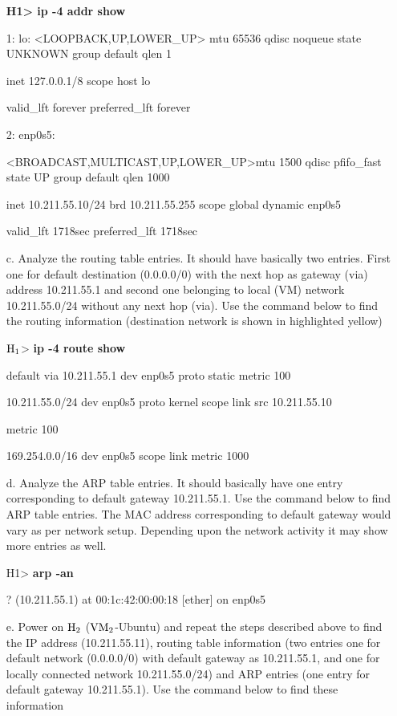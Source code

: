 \begin{multicols}{2}
\begin{itemize}
	\textbf{H1> ip -4 addr show}

	1: lo: <LOOPBACK,UP,LOWER\_UP> mtu 65536 qdisc noqueue state UNKNOWN group default qlen 1

	inet 127.0.0.1/8 scope host lo

	valid\_lft forever preferred\_lft forever

	2: enp0s5: 
	
	<BROADCAST,MULTICAST,UP,LOWER\_UP>\break mtu 1500 qdisc pfifo\_fast state UP group default qlen 1000

	inet 10.211.55.10/24 brd 10.211.55.255 scope global dynamic enp0s5

	valid\_lft 1718sec preferred\_lft 1718sec


\item[c.] Analyze the routing table entries. It should have basically two entries. First one for default destination (0.0.0.0/0) with the next hop as gateway (via) address 10.211.55.1 and second one belonging to local (VM) network 10.211.55.0/24 without any next hop (via). Use the command below to find the routing information (destination network is shown in highlighted yellow)

	${\rm H}_{1}$> \textbf{ip -4 route show}

	default via 10.211.55.1 dev enp0s5 proto static  metric 100

	10.211.55.0/24 dev enp0s5 proto kernel scope link src 10.211.55.10

	metric 100

	169.254.0.0/16 dev enp0s5 scope link  metric 1000

\item[d.] Analyze the ARP table entries. It should basically have one entry corresponding to default gateway 10.211.55.1. Use the command below to find ARP table entries. The MAC address corresponding to default gateway would vary as per network setup. Depending upon the network activity it may show more entries as well.

	H1> \textbf{arp -an}

	? (10.211.55.1) at 00:1c:42:00:00:18 [ether] on enp0s5

\item[e.]  Power on ${\rm H}_{2}$ (${\rm VM}_{2}$-Ubuntu) and repeat the steps described above to find the IP address (10.211.55.11), routing table information (two entries one for default network (0.0.0.0/0) with default gateway as 10.211.55.1, and one for locally connected network 10.211.55.0/24) and ARP entries (one entry for default gateway 10.211.55.1). Use the command below to find these information


\end{itemize}
\end{multicols}
